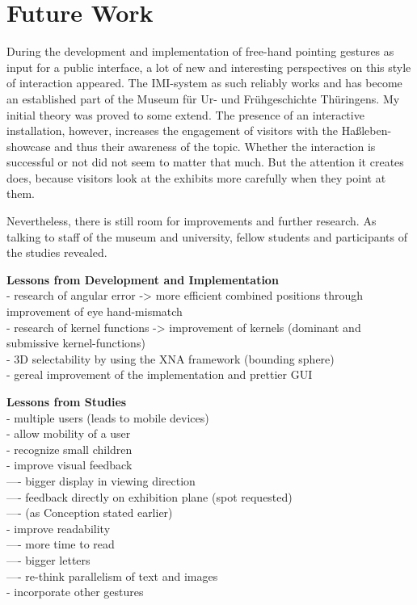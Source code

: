 \chapter{Future Work}
\label{future_work}

During the development and implementation of free-hand pointing gestures as input for a public interface, a lot of new and interesting perspectives on this style of interaction appeared. The \ac{IMI}-system as such reliably works and has become an established part of the Museum für Ur- und Frühgeschichte Thüringens. My initial theory was proved to some extend. The presence of an interactive installation, however, increases the engagement of visitors with the Haßleben-showcase and thus their awareness of the topic. Whether the interaction is successful or not did not seem to matter that much. But the attention it creates does, because visitors look at the exhibits more carefully when they point at them. 

Nevertheless, there is still room for improvements and further research. As talking to staff of the museum and university, fellow students and participants of the studies revealed.

\textbf{Lessons from Development and Implementation}
\\- research of angular error -> more efficient combined positions through improvement of eye hand-mismatch
\\- research of kernel functions -> improvement of kernels (dominant and submissive kernel-functions)  
\\- 3D selectability by using the XNA framework (bounding sphere)
\\- gereal improvement of the implementation and prettier \ac{GUI}

\textbf{Lessons from Studies}
\\- multiple users (leads to mobile devices)
\\- allow mobility of a user
\\- recognize small children
\\- improve visual feedback 
\\---- bigger display in viewing direction
\\---- feedback directly on exhibition plane (spot requested) 
\\---- (as Conception stated earlier)
\\- improve readability
\\---- more time to read
\\---- bigger letters
\\---- re-think parallelism of text and images
\\- incorporate other gestures

